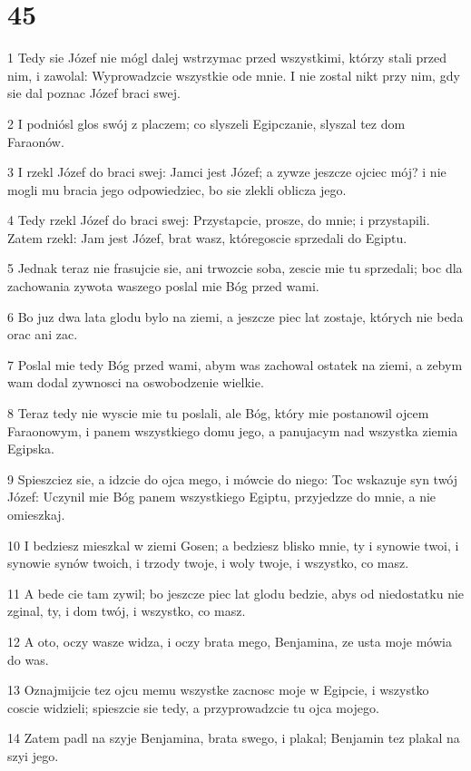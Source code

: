 \chapter{45}

\par 1 Tedy sie Józef nie mógl dalej wstrzymac przed wszystkimi, którzy stali przed nim, i zawolal: Wyprowadzcie wszystkie ode mnie. I nie zostal nikt przy nim, gdy sie dal poznac Józef braci swej.
\par 2 I podniósl glos swój z placzem; co slyszeli Egipczanie, slyszal tez dom Faraonów.
\par 3 I rzekl Józef do braci swej: Jamci jest Józef; a zywze jeszcze ojciec mój? i nie mogli mu bracia jego odpowiedziec, bo sie zlekli oblicza jego.
\par 4 Tedy rzekl Józef do braci swej: Przystapcie, prosze, do mnie; i przystapili. Zatem rzekl: Jam jest Józef, brat wasz, któregoscie sprzedali do Egiptu.
\par 5 Jednak teraz nie frasujcie sie, ani trwozcie soba, zescie mie tu sprzedali; boc dla zachowania zywota waszego poslal mie Bóg przed wami.
\par 6 Bo juz dwa lata glodu bylo na ziemi, a jeszcze piec lat zostaje, których nie beda orac ani zac.
\par 7 Poslal mie tedy Bóg przed wami, abym was zachowal ostatek na ziemi, a zebym wam dodal zywnosci na oswobodzenie wielkie.
\par 8 Teraz tedy nie wyscie mie tu poslali, ale Bóg, który mie postanowil ojcem Faraonowym, i panem wszystkiego domu jego, a panujacym nad wszystka ziemia Egipska.
\par 9 Spieszciez sie, a idzcie do ojca mego, i mówcie do niego: Toc wskazuje syn twój Józef: Uczynil mie Bóg panem wszystkiego Egiptu, przyjedzze do mnie, a nie omieszkaj.
\par 10 I bedziesz mieszkal w ziemi Gosen; a bedziesz blisko mnie, ty i synowie twoi, i synowie synów twoich, i trzody twoje, i woly twoje, i wszystko, co masz.
\par 11 A bede cie tam zywil; bo jeszcze piec lat glodu bedzie, abys od niedostatku nie zginal, ty, i dom twój, i wszystko, co masz.
\par 12 A oto, oczy wasze widza, i oczy brata mego, Benjamina, ze usta moje mówia do was.
\par 13 Oznajmijcie tez ojcu memu wszystke zacnosc moje w Egipcie, i wszystko coscie widzieli; spieszcie sie tedy, a przyprowadzcie tu ojca mojego.
\par 14 Zatem padl na szyje Benjamina, brata swego, i plakal; Benjamin tez plakal na szyi jego.

